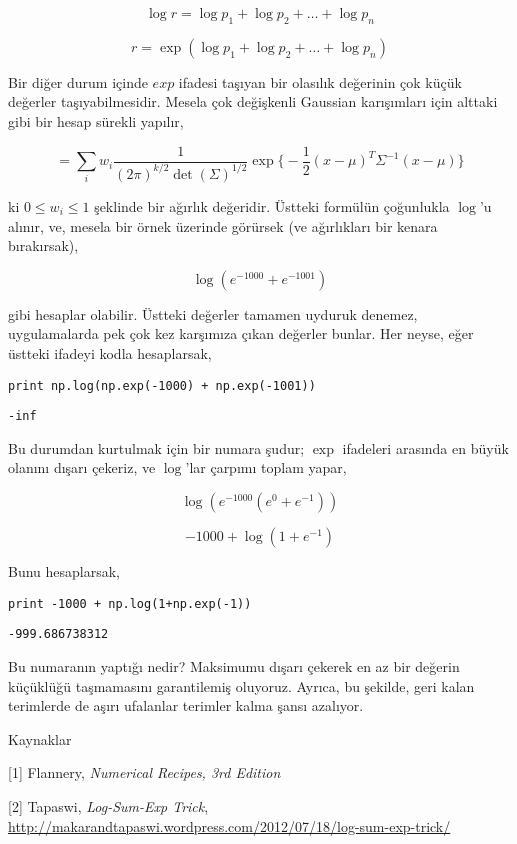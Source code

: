 \documentclass[12pt,fleqn]{article}\usepackage{../../common}
\begin{document}
$$ \log r = \log p_1 + \log p_2 + \dots + \log p_n $$

$$ r = \exp(\log p_1 + \log p_2 + \dots + \log p_n )$$

Bir diğer durum içinde $exp$ ifadesi taşıyan bir olasılık değerinin çok
küçük değerler taşıyabilmesidir. Mesela çok değişkenli Gaussian karışımları
için alttaki gibi bir hesap sürekli yapılır, 

$$ = \sum_i w_i
\frac{ 1}{(2\pi)^{k/2} \det(\Sigma)^{1/2}} \exp 
\bigg\{ 
-\frac{ 1}{2}(x-\mu)^T\Sigma^{-1}(x-\mu)
\bigg\}
$$

ki $0 \le w_i \le 1$ şeklinde bir ağırlık değeridir. Üstteki formülün
çoğunlukla $\log$'u alınır, ve, mesela bir örnek üzerinde görürsek (ve
ağırlıkları bir kenara bırakırsak), 

$$ \log(e^{-1000} + e^{-1001}) $$ 

gibi hesaplar olabilir. Üstteki değerler tamamen uyduruk denemez,
uygulamalarda pek çok kez karşımıza çıkan değerler bunlar. Her neyse, eğer
üstteki ifadeyi kodla hesaplarsak, 

\begin{verbatim}
print np.log(np.exp(-1000) + np.exp(-1001))
\end{verbatim}

\begin{verbatim}
-inf
\end{verbatim}

Bu durumdan kurtulmak için bir numara şudur; $\exp$ ifadeleri arasında en
büyük olanını dışarı çekeriz, ve $\log$'lar çarpımı toplam yapar,

$$ \log(e^{-1000}(e^{0} + e^{-1} ))$$

$$ -1000 + \log(1 + e^{-1})$$

Bunu hesaplarsak, 

\begin{verbatim}
print -1000 + np.log(1+np.exp(-1))
\end{verbatim}

\begin{verbatim}
-999.686738312
\end{verbatim}

Bu numaranın yaptığı nedir? Maksimumu dışarı çekerek en az bir değerin
küçüklüğü taşmamasını garantilemiş oluyoruz. Ayrıca, bu şekilde, geri kalan
terimlerde de aşırı ufalanlar terimler kalma şansı azalıyor. 

Kaynaklar

[1] Flannery, {\em Numerical Recipes, 3rd Edition}

[2] Tapaswi, {\em Log-Sum-Exp Trick}, \url{http://makarandtapaswi.wordpress.com/2012/07/18/log-sum-exp-trick/}
\end{document}
